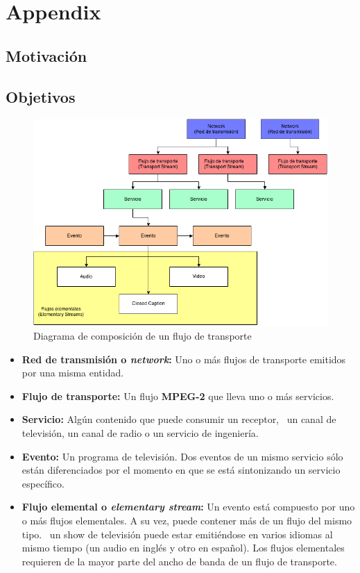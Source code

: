\ifx\all\undefined


\fi

\chapter{Appendix} %

\section{Motivación}


\section{Objetivos}






\begin{figure}[h!]
	\includegraphics[width=12cm]{imgs/mpeg_structure.png}
	\caption{Diagrama de composición de un flujo de transporte} 
	\centering 
\end{figure}

\begin{itemize}
\item \textbf{Red de transmisión o \emph{network}:} Uno o más flujos de transporte emitidos por una misma entidad.
\item \textbf{Flujo de transporte:} Un flujo \textbf{MPEG-2} que lleva uno o más servicios.
\item \textbf{Servicio:} Algún contenido que puede consumir un receptor, \eg\ un canal de televisión, un canal de radio o un servicio de ingeniería. 
\item \textbf{Evento:} Un programa de televisión. Dos eventos de un mismo servicio sólo están diferenciados por el momento en que se está sintonizando un servicio específico.
\item \textbf{Flujo elemental o \emph{elementary stream}:} Un evento está compuesto por uno o más flujos elementales. A su vez, puede contener más de un flujo del mismo tipo. \eg\ un show de televisión puede estar emitiéndose en varios idiomas al mismo tiempo (un audio en inglés y otro en español). Los flujos elementales requieren de la mayor parte del ancho de banda de un flujo de transporte.
\end{itemize}

